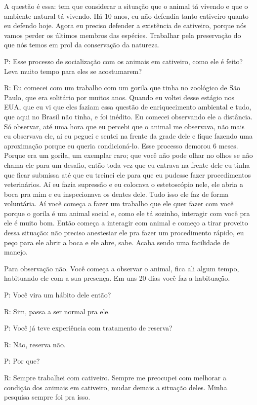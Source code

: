 A questão é essa: tem que considerar a situação que o animal tá vivendo e que o ambiente natural tá vivendo. Há 10 anos, eu não defendia tanto cativeiro quanto eu defendo hoje. Agora eu preciso defender a existência de cativeiro, porque nós vamos perder os últimos membros das espécies. Trabalhar pela preservação do que nós temos em prol da conservação da natureza.


P: Esse processo de socialização com os animais em cativeiro, como ele é feito? Leva muito tempo para eles se acostumarem? 

R: Eu comecei com um trabalho com um gorila que tinha no zoológico de São Paulo, que era solitário por muitos anos. Quando eu voltei desse estágio nos EUA, que eu vi que eles faziam essa questão de enriquecimento ambiental e tudo, que aqui no Brasil não tinha, e foi inédito. Eu comecei observando ele a distância. Só observar, até uma hora que eu percebi que o animal me observava, não mais eu observava ele, ai eu peguei e sentei na frente da grade dele e fique fazendo uma aproximação porque eu queria condicioná-lo. Esse processo demorou 6 meses. Porque era um gorila, um exemplar raro; que você não pode olhar no olhos se não chama ele para um desafio, então toda vez que eu entrava na frente dele eu tinha que ficar submissa até que eu treinei ele para que eu pudesse fazer procedimentos veterinários. Aí eu fazia supressão e eu colocava o estetoscópio nele, ele abria a boca pra mim e eu inspecionava os dentes dele. Tudo isso ele faz de forma voluntária. Aí você começa a fazer um trabalho que ele quer fazer com você porque o gorila é um animal social e, como ele tá sozinho, interagir com você pra ele é muito bom. Então começa a interagir com animal e começo a tirar proveito dessa situação: não preciso anestesiar ele pra fazer um procedimento rápido, eu peço para ele abrir a boca e ele abre, sabe. Acaba sendo uma facilidade de manejo. 

Para observação não. Você começa a observar o animal, fica ali algum tempo, habituando ele com a sua presença. Em uns 20 dias você faz a habituação.


P: Você vira um hábito dele então?

R: Sim, passa a ser normal pra ele.


P: Você já teve experiência com tratamento de reserva?

R: Não, reserva não.


P: Por que?

R: Sempre trabalhei com cativeiro. Sempre me preocupei com melhorar a condição dos animais em cativeiro, mudar demais a situação deles. Minha pesquisa sempre foi pra isso.

